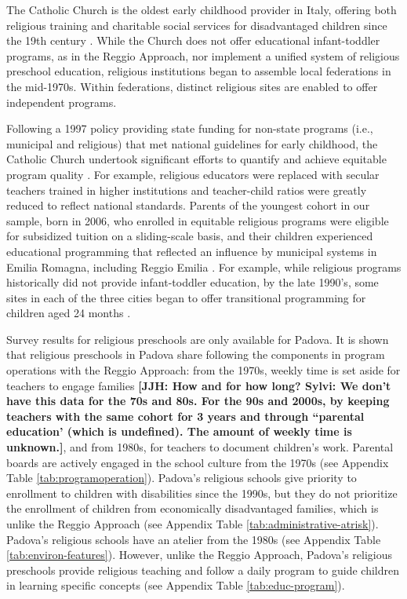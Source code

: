 The Catholic Church is the oldest early childhood provider in Italy, offering both religious training and charitable social services for disadvantaged children since the 19th century \citep{OECD_2001_Italy-Country-Note}. While the Church does not offer educational infant-toddler programs, as in the Reggio Approach, nor implement a unified system of religious preschool education, religious institutions began to assemble local federations in the mid-1970s. Within federations, distinct religious sites are enabled to offer independent programs.

Following a 1997 policy providing state funding for non-state programs (i.e., municipal and religious) that met national guidelines for early childhood, the Catholic Church undertook significant efforts to quantify and achieve equitable program quality \citep{Malizia-Cicatelli_2011_BOOK_Catholic-School}. For example, religious educators were replaced with secular teachers trained in higher institutions and teacher-child ratios were greatly reduced to reflect national standards. Parents of the youngest cohort in our sample, born in 2006, who enrolled in equitable religious programs were eligible for subsidized tuition on a sliding-scale basis, and their children experienced educational programming that reflected an influence by municipal systems in Emilia Romagna, including Reggio Emilia \citep{Hohnerlein_2009_Paradox-Public-Preschools,OECD_2001_Italy-Country-Note}. For example, while religious programs historically did not provide infant-toddler education, by the late 1990's, some sites in each of the three cities began to offer transitional programming for children aged 24 months \citep{Malizia-Cicatelli_2011_BOOK_Catholic-School,CEHD_2016_Historical-Analysis}.

Survey results for religious preschools are only available for Padova. It is shown that religious preschools in Padova share following the components in program operations with the Reggio Approach: from the 1970s, weekly time is set aside for teachers to engage families \textbf{[JJH: How and for how long? Sylvi: We don't have this data for the 70s and 80s. For the 90s and 2000s, by keeping teachers with the same cohort for 3 years and through ``parental education' (which is undefined). The amount of weekly time is unknown.]}, and from 1980s, for teachers to document children's work. Parental boards are actively engaged in the school culture from the 1970s (see Appendix Table \ref{tab:programoperation}). Padova's religious schools give priority to enrollment to children with disabilities since the 1990s, but they do not prioritize the enrollment of children from economically disadvantaged families, which is unlike the Reggio Approach (see Appendix Table \ref{tab:administrative-atrisk}). Padova's religious schools have an atelier from the 1980s (see Appendix Table \ref{tab:environ-features}). However, unlike the Reggio Approach, Padova's religious preschools provide religious teaching and follow a daily program to guide children in learning specific concepts (see Appendix Table \ref{tab:educ-program}).

